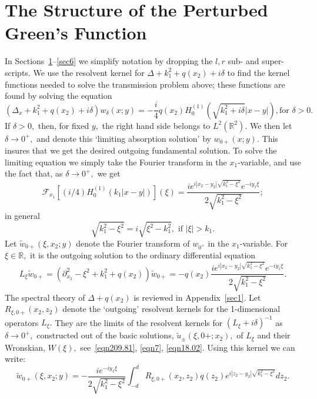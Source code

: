 \documentclass[11pt]{article}
\newcommand\tu{\widetilde u}
\newcommand\cF{\mathcal F}
\newcommand\tw{\tilde w_{0+}}
\newcommand\bbR{\mathbb R}
\newcommand\pa{\partial}
\theoremstyle{definition}
\theoremstyle{remark}
\begin{document}
\section{The Structure of the Perturbed Green's Function}\label{sec3.55}
In Sections~\ref{sec3.55}--\ref{sec6} we simplify notation by dropping the $l,r$ sub- and
super-scripts.  We use the resolvent kernel for $\Delta+k_1^2+q(x_2)+i\delta$ to find the
kernel functions needed to solve the transmission problem above; these functions
are found by solving the equation
      \begin{equation}
        (\Delta_x+k_1^2+q(x_2)+i\delta)w_{\delta}(x;y)=-\frac{i}{4}q(x_2)
        H^{(1)}_0(\sqrt{k^2_1+i\delta}|x-y|),\text{
          for }\delta>0.
      \end{equation}
If $\delta>0,$ then, for fixed $y,$ the right hand side belongs to
$L^2(\bbR^2).$ We then let $\delta\to 0^+,$ and denote this `limiting absorption
solution' by $w_{0+}(x;y).$ This insures that we get the desired
outgoing fundamental solution. To solve the limiting equation we simply take
the Fourier transform in the $x_1$-variable, and use the fact that, as
$\delta\to 0^+,$ we get
\begin{equation}\label{eqn26.51}
  \cF_{x_1}[(i/4)H^{(1)}_0(k_1|x-y|)](\xi)=\frac{ie^{i|x_2-y_2|\sqrt{k_1^2-\xi^2}}e^{-iy_1\xi}}{2\sqrt{k_1^2-\xi^2}};
\end{equation}
in general
$$\sqrt{k_1^2-\xi^2}=i\sqrt{\xi^2-k_1^2},\text{ if }|\xi|>k_1.$$
Let $\tw(\xi,x_2;y)$ denote the Fourier transform of $w_{0^+}$ in the
$x_1$-variable. For $\xi\in\bbR,$ it is the outgoing solution to the ordinary
differential equation
\begin{equation}
  L_{\xi}\tw=(\pa_{x_2}^2-\xi^2+k_1^2+q(x_2))\tw=-q(x_2)\frac{ie^{i|x_2-y_2|\sqrt{k_1^2-\xi^2}}e^{-iy_1\xi}}{2\sqrt{k_1^2-\xi^2}}.
\end{equation}
The spectral theory of $\Delta+q(x_2)$ is reviewed in Appendix~\ref{sec1}.  Let
$R_{\xi,0+}(x_2,z_2)$ denote the `outgoing' resolvent kernels for the
1-dimensional operators $L_{\xi}.$ They are the limits of the resolvent kernels
for $(L_{\xi}+i\delta)^{-1}$ as $\delta\to 0^+,$ constructed out of the basic
solutions, $\tu_{\pm}(\xi,0+;x_2),$ of $L_{\xi}$ and their Wronskian, $W(\xi),$
see~\eqref{eqn209.81}, \eqref{eqn7}, \eqref{eqn18.02}.  Using this kernel we can
write:
\begin{equation}\label{eqn28.51}
  \tw(\xi,x_2;y)=-\frac{ie^{-iy_1\xi}}{2\sqrt{k_1^2-\xi^2}}\int_{-d}^{d}
  R_{\xi,0+}(x_2,z_2)q(z_2)e^{i|z_2-y_2|\sqrt{k_1^2-\xi^2}}dz_2.
\end{equation}
\end{document}
